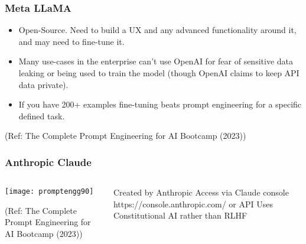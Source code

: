 \begin{frame}[fragile]\frametitle{Meta LLaMA}

\begin{itemize}
\item  Open-Source. Need to build a UX and any advanced functionality around it, and may need to fine-tune it.
\item Many use-cases in the enterprise can’t use OpenAI for fear of sensitive data leaking or being used to train the model (though OpenAI claims to keep API data private).
\item If you have 200+ examples fine-tuning beats prompt engineering for a specific defined task.
\end{itemize}	 

{\tiny (Ref: The Complete Prompt Engineering for AI Bootcamp (2023))}

\end{frame}

\begin{frame}[fragile]\frametitle{Anthropic Claude}


\begin{columns}
    \begin{column}[T]{0.6\linewidth}
		\begin{center}
		\texttt{[image: promptengg90]}

		{\tiny (Ref: The Complete Prompt Engineering for AI Bootcamp (2023))}
		\end{center}	
    \end{column}
    \begin{column}[T]{0.4\linewidth}
		Created by Anthropic 
		Access via Claude console https://console.anthropic.com/ or API
		Uses Constitutional AI rather than RLHF
    \end{column}
  \end{columns}
\end{frame}

